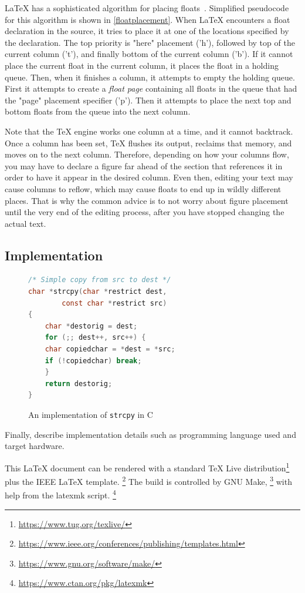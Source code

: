 \documentclass[
	conference,	%
]{IEEEtran}
\newcommand{\newterm}[1]{\textit{#1}}
\begin{document}
{\LaTeX} has a sophisticated algorithm
for placing floats~\cite{Mittelbach2014FloatAlgorithm}.
Simplified pseudocode for this algorithm is shown in \autoref{floatplacement}.
When {\LaTeX} encounters a float declaration in the source,
it tries to place it at one of the locations specified by the declaration.
The top priority is "here" placement ('h'),
followed by top of the current column ('t'),
and finally bottom of the current column ('b').
If it cannot place the current float in the current column,
it places the float in a holding queue.
Then,
when it finishes a column,
it attempts to empty the holding queue.
First it attempts to create a \newterm{float page} containing
all floats in the queue that had the "page" placement specifier ('p').
Then it attempts to place the next top and bottom floats
from the queue into the next column.

Note that the {\TeX} engine works one column at a time,
and it cannot backtrack.
Once a column has been set, {\TeX} flushes its output, reclaims that memory,
and moves on to the next column.
Therefore,
depending on how your columns flow,
you may have to declare a figure far ahead of the section that references it
in order to have it appear in the desired column.
Even then, editing your text may cause columns to reflow,
which may cause floats to end up in wildly different places.
That is why the common advice is to not worry about figure placement until the
very end of the editing process,
after you have stopped changing the actual text.


\subsection{Implementation}
\label{implementation}

\begin{figure}
\begin{lstlisting}[language=C]
/* Simple copy from src to dest */
char *strcpy(char *restrict dest,
		const char *restrict src)
{
    char *destorig = dest;
    for (;; dest++, src++) {
	char copiedchar = *dest = *src;
	if (!copiedchar) break;
    }
    return destorig;
}
\end{lstlisting}
\caption{An implementation of \lstinline{strcpy} in C}
\label{strcpy}
\end{figure}

Finally, describe implementation details such as programming language
used and target hardware.

This {\LaTeX} document can be rendered with a standard
{\TeX} Live distribution\footnote{\url{https://www.tug.org/texlive/}}
plus the IEEE {\LaTeX} template.%
\footnote{\url{https://www.ieee.org/conferences/publishing/templates.html}}
The build is controlled by GNU Make,%
\footnote{\url{https://www.gnu.org/software/make/}}
with help from the latexmk script.%
\footnote{\url{https://www.ctan.org/pkg/latexmk}}
\end{document}
